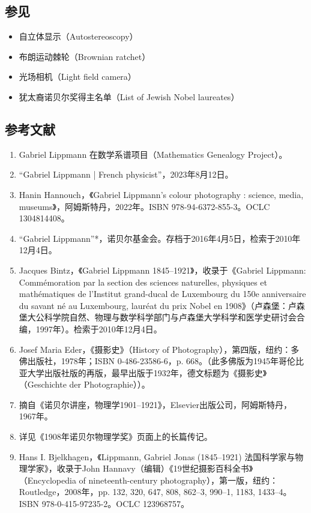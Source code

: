 \subsection{参见} 
\begin{itemize}
\item 自立体显示（Autostereoscopy）  
\item 布朗运动棘轮（Brownian ratchet）  
\item 光场相机（Light field camera）  
\item 犹太裔诺贝尔奖得主名单（List of Jewish Nobel laureates） 
\end{itemize} 
\subsection{参考文献}
\begin{enumerate}
\item Gabriel Lippmann 在数学系谱项目（Mathematics Genealogy Project）。
\item “Gabriel Lippmann | French physicist”，2023年8月12日。
\item Hanin Hannouch，《Gabriel Lippmann's colour photography : science, media, museums》，阿姆斯特丹，2022年。ISBN 978-94-6372-855-3。OCLC 1304814408。
\item “Gabriel Lippmann”*，诺贝尔基金会。存档于2016年4月5日，检索于2010年12月4日。
\item Jacques Bintz，《Gabriel Lippmann 1845–1921》，收录于《Gabriel Lippmann: Commémoration par la section des sciences naturelles, physiques et mathématiques de l’Institut grand-ducal de Luxembourg du 150e anniversaire du savant né au Luxembourg, lauréat du prix Nobel en 1908》（卢森堡：卢森堡大公科学院自然、物理与数学科学部门与卢森堡大学科学和医学史研讨会合编，1997年）。检索于2010年12月4日。
\item Josef Maria Eder，《摄影史》（History of Photography），第四版，纽约：多佛出版社，1978年；ISBN 0-486-23586-6，p. 668。（此多佛版为1945年哥伦比亚大学出版社版的再版，最早出版于1932年，德文标题为《摄影史》（Geschichte der Photographie））。
\item 摘自《诺贝尔讲座，物理学1901–1921》，Elsevier出版公司，阿姆斯特丹，1967年。
\item 详见《1908年诺贝尔物理学奖》页面上的长篇传记。
\item Hans I. Bjelkhagen，《Lippmann, Gabriel Jonas (1845–1921) 法国科学家与物理学家》，收录于John Hannavy（编辑）《19世纪摄影百科全书》（Encyclopedia of nineteenth-century photography），第一版，纽约：Routledge，2008年，pp. 132, 320, 647, 808, 862–3, 990–1, 1183, 1433–4。ISBN 978-0-415-97235-2。OCLC 123968757。

\end{enumerate}
